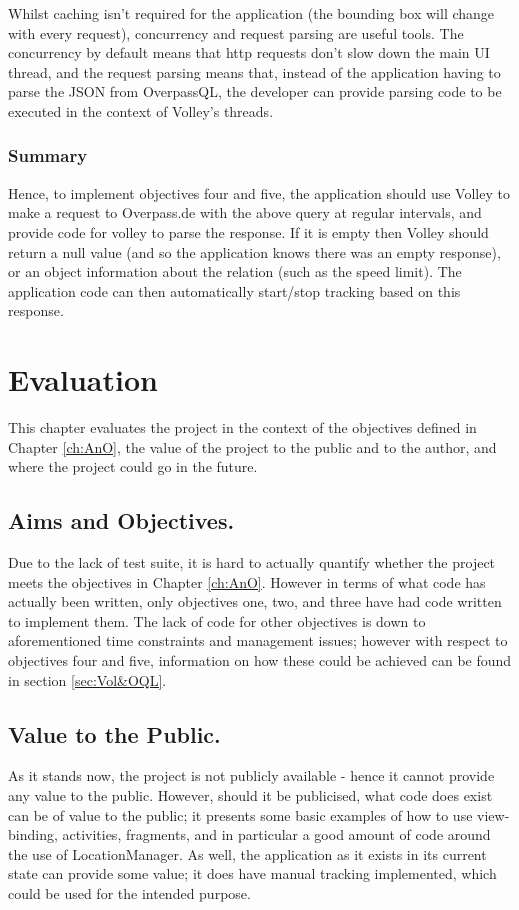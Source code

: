 \documentclass[11pt, a4paper, notitlepage]{report}
\begin{document}
Whilst caching isn't required for the application (the bounding box will change with every request), concurrency and request parsing are useful tools. The concurrency by default means that http requests don't slow down the main UI thread, and the request parsing means that, instead of the application having to parse the JSON from OverpassQL, the developer can provide parsing code to be executed in the context of Volley's threads.

\subsection{Summary}
Hence, to implement objectives four and five, the application should use Volley to make a request to Overpass.de with the above query at regular intervals, and provide code for volley to parse the response. If it is empty then Volley should return a null value (and so the application knows there was an empty response), or an object information about the relation (such as the speed limit). The application code can then automatically start/stop tracking based on this response.

\chapter{Evaluation}
This chapter evaluates the project in the context of the objectives defined in Chapter \ref{ch:AnO}, the value of the project to the public and to the author, and where the project could go in the future.

\section{Aims and Objectives.}
Due to the lack of test suite, it is hard to actually quantify whether the project meets the objectives in Chapter \ref{ch:AnO}. However in terms of what code has actually been written, only objectives one, two, and three have had code written to implement them. The lack of code for other objectives is down to aforementioned time constraints and management issues; however with respect to objectives four and five, information on how these could be achieved can be found in section \ref{sec:Vol&OQL}.

\section{Value to the Public.}
As it stands now, the project is not publicly available - hence it cannot provide any value to the public. However, should it be publicised, what code does exist can be of value to the public; it presents some basic examples of how to use view-binding, activities, fragments, and in particular a good amount of code around the use of LocationManager. As well, the application as it exists in its current state can provide some value; it does have manual tracking implemented, which could be used for the intended purpose.
\end{document}
